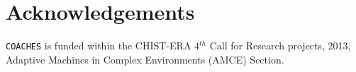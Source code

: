 \documentclass{llncs}
\def\coaches{{\tt COACHES} }
\begin{document}










\section*{Acknowledgements}

\coaches is funded within the CHIST-ERA 4$^{th}$ Call for Research projects, 2013,
Adaptive Machines in Complex Environments (AMCE) Section.




\end{document}
